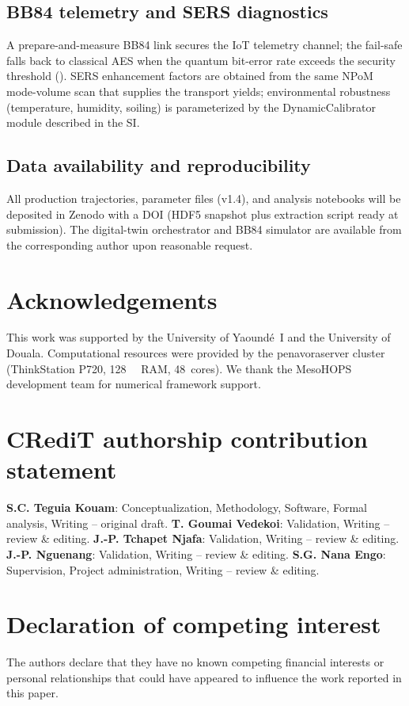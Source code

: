 \documentclass[preprint,12pt]{elsarticle}
\begin{document}
\subsection{BB84 telemetry and SERS diagnostics}
A prepare-and-measure BB84 link secures the IoT telemetry channel; the fail-safe falls back to classical AES when the quantum bit-error rate exceeds the security threshold (). SERS enhancement factors are obtained from the same NPoM mode-volume scan that supplies the transport yields; environmental robustness (temperature, humidity, soiling) is parameterized by the DynamicCalibrator module described in the SI.

\subsection*{Data availability and reproducibility}
All production trajectories, parameter files (v1.4), and analysis notebooks will be deposited in Zenodo with a DOI (HDF5 snapshot plus extraction script ready at submission). The digital-twin orchestrator and BB84 simulator are available from the corresponding author upon reasonable request.

\section*{Acknowledgements}
This work was supported by the University of Yaound\'{e}~I and the University of Douala.
Computational resources were provided by the penavoraserver cluster (ThinkStation P720, \qty{128}{\giga\byte} RAM, 48~cores).
We thank the MesoHOPS development team for numerical framework support.

\section*{CRediT authorship contribution statement}
\textbf{S.C. Teguia Kouam}: Conceptualization, Methodology, Software, Formal analysis, Writing -- original draft.
\textbf{T. Goumai Vedekoi}: Validation, Writing -- review \& editing.
\textbf{J.-P. Tchapet Njafa}: Validation, Writing -- review \& editing.
\textbf{J.-P. Nguenang}: Validation, Writing -- review \& editing.
\textbf{S.G. Nana Engo}: Supervision, Project administration, Writing -- review \& editing.

\section*{Declaration of competing interest}
The authors declare that they have no known competing financial interests or personal relationships that could have appeared to influence the work reported in this paper.
\end{document}
